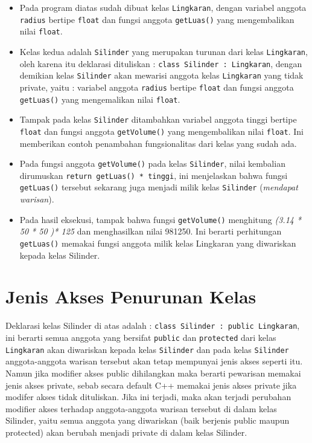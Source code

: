 \begin{itemize}

\item
  Pada program diatas sudah dibuat kelas \texttt{Lingkaran}, dengan
  variabel anggota \texttt{radius} bertipe \texttt{float} dan fungsi
  anggota \texttt{getLuas()} yang mengembalikan nilai \texttt{float}.
\item
  Kelas kedua adalah \texttt{Silinder} yang merupakan turunan dari kelas
  \texttt{Lingkaran}, oleh karena itu deklarasi dituliskan :
  \texttt{class\ Silinder\ :\ Lingkaran}, dengan demikian kelas
  \texttt{Silinder} akan mewarisi anggota kelas \texttt{Lingkaran} yang
  tidak private, yaitu : variabel anggota \texttt{radius} bertipe
  \texttt{float} dan fungsi anggota \texttt{getLuas()} yang mengemalikan
  nilai \texttt{float}.
\item
  Tampak pada kelas \texttt{Silinder} ditambahkan variabel anggota
  tinggi bertipe \texttt{float} dan fungsi anggota \texttt{getVolume()}
  yang mengembalikan nilai \texttt{float}. Ini memberikan contoh
  penambahan fungsionalitas dari kelas yang sudah ada.
\item
  Pada fungsi anggota \texttt{getVolume()} pada kelas \texttt{Silinder},
  nilai kembalian dirumuskan \texttt{return\ getLuas()\ *\ tinggi}, ini
  menjelaskan bahwa fungsi \texttt{getLuas()} tersebut sekarang juga
  menjadi milik kelas \texttt{Silinder} (\emph{mendapat warisan}).
\item
  Pada hasil eksekusi, tampak bahwa fungsi \texttt{getVolume()}
  menghitung \emph{(3.14 * 50 * 50 )* 125} dan menghasilkan nilai
  981250. Ini berarti perhitungan \texttt{getLuas()} memakai fungsi
  anggota milik kelas Lingkaran yang diwariskan kepada kelas Silinder.
\end{itemize}

\section{Jenis Akses Penurunan
Kelas}\label{jenis-akses-penurunan-kelas}

Deklarasi kelas Silinder di atas adalah :
\texttt{class\ Silinder\ :\ public\ Lingkaran}, ini berarti semua
anggota yang bersifat \texttt{public} dan \texttt{protected} dari kelas
\texttt{Lingkaran} akan diwariskan kepada kelas \texttt{Silinder} dan
pada kelas \texttt{Silinder} anggota-anggota warisan tersebut akan tetap
mempunyai jenis akses seperti itu. Namun jika modifier akses public
dihilangkan maka berarti pewarisan memakai jenis akses private, sebab
secara default C++ memakai jenis akses private jika modifer akses tidak
dituliskan. Jika ini terjadi, maka akan terjadi perubahan modifier akses
terhadap anggota-anggota warisan tersebut di dalam kelas Silinder, yaitu
semua anggota yang diwariskan (baik berjenis public maupun protected)
akan berubah menjadi private di dalam kelas Silinder.

